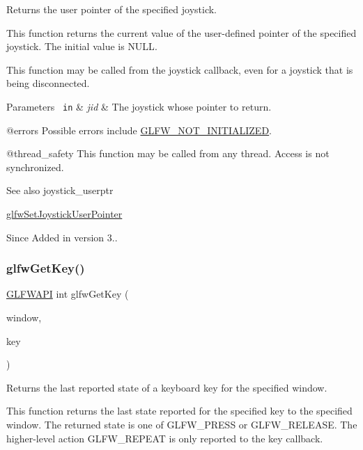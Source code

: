 Returns the user pointer of the specified joystick. 

This function returns the current value of the user-\/defined pointer of the specified joystick. The initial value is {\ttfamily N\+U\+LL}.

This function may be called from the joystick callback, even for a joystick that is being disconnected.


\begin{DoxyParams}[1]{Parameters}
\mbox{\texttt{ in}}  & {\em jid} & The joystick whose pointer to return.\\
\hline
\end{DoxyParams}
@errors Possible errors include \mbox{\hyperlink{group__errors_ga2374ee02c177f12e1fa76ff3ed15e14a}{G\+L\+F\+W\+\_\+\+N\+O\+T\+\_\+\+I\+N\+I\+T\+I\+A\+L\+I\+Z\+ED}}.

@thread\+\_\+safety This function may be called from any thread. Access is not synchronized.

\begin{DoxySeeAlso}{See also}
joystick\+\_\+userptr 

\mbox{\hyperlink{group__input_ga3a8999c2d2634c7bcf4a04f1ec64895c}{glfw\+Set\+Joystick\+User\+Pointer}}
\end{DoxySeeAlso}
\begin{DoxySince}{Since}
Added in version 3.. 
\end{DoxySince}
\mbox{\label{group__input_ga7d8ad8ffaf272808f04e1d5d33ec8859}} 
\subsubsection{\texorpdfstring{glfwGetKey()}{glfwGetKey()}}
{\footnotesize\ttfamily \mbox{\hyperlink{glfw3_8h_a56da5036b2cc259351ae22fd6439bb47}{G\+L\+F\+W\+A\+PI}} int glfw\+Get\+Key (\begin{DoxyParamCaption}\item[{\mbox{\hyperlink{group__window_ga3c96d80d363e67d13a41b5d1821f3242}{G\+L\+F\+Wwindow}} $\ast$}]{window,  }\item[{int}]{key }\end{DoxyParamCaption})}



Returns the last reported state of a keyboard key for the specified window. 

This function returns the last state reported for the specified key to the specified window. The returned state is one of {\ttfamily G\+L\+F\+W\+\_\+\+P\+R\+E\+SS} or {\ttfamily G\+L\+F\+W\+\_\+\+R\+E\+L\+E\+A\+SE}. The higher-\/level action {\ttfamily G\+L\+F\+W\+\_\+\+R\+E\+P\+E\+AT} is only reported to the key callback.

